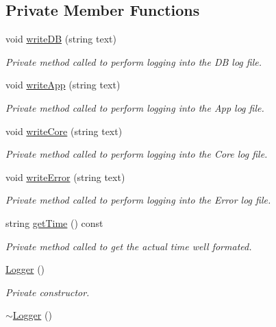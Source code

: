 \subsection*{Private Member Functions}
\begin{DoxyCompactItemize}
\item 
void \hyperlink{class_logger_a3d8c044818fd8f182f378f36f42cb015}{write\+D\+B} (string text)
\begin{DoxyCompactList}\small\item\em Private method called to perform logging into the D\+B log file. \end{DoxyCompactList}\item 
void \hyperlink{class_logger_aa2590f8c5678cec98b097635063fb406}{write\+App} (string text)
\begin{DoxyCompactList}\small\item\em Private method called to perform logging into the App log file. \end{DoxyCompactList}\item 
void \hyperlink{class_logger_a194d35113db4da008024513e9b0ed2ee}{write\+Core} (string text)
\begin{DoxyCompactList}\small\item\em Private method called to perform logging into the Core log file. \end{DoxyCompactList}\item 
void \hyperlink{class_logger_a4959160a3f836d723641b94fa512309e}{write\+Error} (string text)
\begin{DoxyCompactList}\small\item\em Private method called to perform logging into the Error log file. \end{DoxyCompactList}\item 
string \hyperlink{class_logger_a2d5e0070bc8c198aebaa272c9c1ca086}{get\+Time} () const 
\begin{DoxyCompactList}\small\item\em Private method called to get the actual time well formated. \end{DoxyCompactList}\item 
\hyperlink{class_logger_abc41bfb031d896170c7675fa96a6b30c}{Logger} ()
\begin{DoxyCompactList}\small\item\em Private constructor. \end{DoxyCompactList}\item 
\hyperlink{class_logger_acb668a9e186a25fbaad2e4af6d1ed00a}{$\sim$\+Logger} ()

\end{DoxyCompactItemize}

